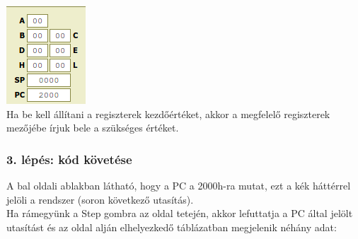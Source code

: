 \documentclass{article}
\begin{document}
\includegraphics[scale=0.5]{sim_lepes5.png} \\
Ha be kell állítani a regiszterek kezdőértéket, akkor a megfelelő regiszterek mezőjébe írjuk bele a szükséges értéket.

\subsubsection{3. lépés: kód követése}

A bal oldali ablakban látható, hogy a PC a 2000h-ra mutat, ezt a kék háttérrel jelöli a rendszer (soron következő utasítás).\\ 
Ha rámegyünk a Step gombra az oldal tetején, akkor lefuttatja a PC által jelölt utasítást és az oldal alján elhelyezkedő táblázatban megjelenik néhány adat:
\end{document}
